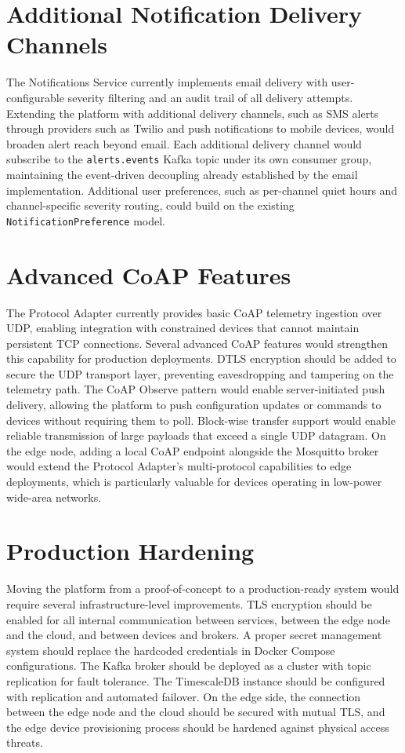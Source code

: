 \section{Additional Notification Delivery Channels}
The Notifications Service currently implements email delivery with user-configurable severity filtering and an audit trail of all delivery attempts. Extending the platform with additional delivery channels, such as SMS alerts through providers such as Twilio and push notifications to mobile devices, would broaden alert reach beyond email. Each additional delivery channel would subscribe to the \texttt{alerts.events} Kafka topic under its own consumer group, maintaining the event-driven decoupling already established by the email implementation. Additional user preferences, such as per-channel quiet hours and channel-specific severity routing, could build on the existing \texttt{NotificationPreference} model.

\section{Advanced CoAP Features}
The Protocol Adapter currently provides basic \gls{CoAP} telemetry ingestion over \gls{UDP}, enabling integration with constrained devices that cannot maintain persistent \gls{TCP} connections. Several advanced \gls{CoAP} features would strengthen this capability for production deployments. \gls{DTLS} encryption should be added to secure the \gls{UDP} transport layer, preventing eavesdropping and tampering on the telemetry path. The CoAP Observe pattern would enable server-initiated push delivery, allowing the platform to push configuration updates or commands to devices without requiring them to poll. Block-wise transfer support would enable reliable transmission of large payloads that exceed a single \gls{UDP} datagram. On the edge node, adding a local \gls{CoAP} endpoint alongside the Mosquitto broker would extend the Protocol Adapter's multi-protocol capabilities to edge deployments, which is particularly valuable for devices operating in low-power wide-area networks.

\section{Production Hardening}
Moving the platform from a proof-of-concept to a production-ready system would require several infrastructure-level improvements. \gls{TLS} encryption should be enabled for all internal communication between services, between the edge node and the cloud, and between devices and brokers. A proper secret management system should replace the hardcoded credentials in Docker Compose configurations. The Kafka broker should be deployed as a cluster with topic replication for fault tolerance. The TimescaleDB instance should be configured with replication and automated failover. On the edge side, the connection between the edge node and the cloud should be secured with mutual \gls{TLS}, and the edge device provisioning process should be hardened against physical access threats.

